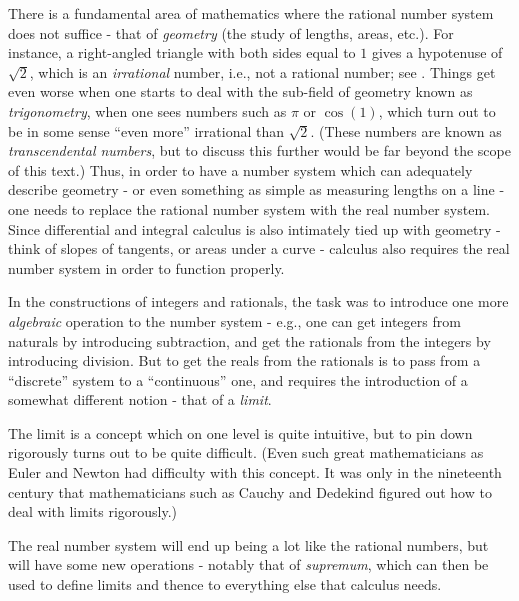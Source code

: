 \begin{note}
  There is a fundamental area of mathematics where the rational number system does not suffice - that of \emph{geometry}
  (the study of lengths, areas, etc.).
  For instance, a right-angled triangle with both sides equal to \(1\) gives a hypotenuse of \(\sqrt{2}\), which is an \emph{irrational} number, i.e., not a rational number;
  see .
  Things get even worse when one starts to deal with the sub-field of geometry known as \emph{trigonometry}, when one sees numbers such as \(\pi\) or \(\cos(1)\), which turn out to be in some sense ``even more'' irrational than \(\sqrt{2}\).
  (These numbers are known as \emph{transcendental numbers}, but to discuss this further would be far beyond the scope of this text.)
  Thus, in order to have a number system which can adequately describe geometry
  - or even something as simple as measuring lengths on a line
  - one needs to replace the rational number system with the real number system.
  Since differential and integral calculus is also intimately tied up with geometry
  - think of slopes of tangents, or areas under a curve
  - calculus also requires the real number system in order to function properly.
\end{note}

\begin{note}
  In the constructions of integers and rationals, the task was to introduce one more \emph{algebraic} operation to the number system
  - e.g., one can get integers from naturals by introducing subtraction, and get the rationals from the integers by introducing division.
  But to get the reals from the rationals is to pass from a ``discrete'' system to a ``continuous'' one, and requires the introduction of a somewhat different notion
  - that of a \emph{limit}.
\end{note}

\begin{note}
  The limit is a concept which on one level is quite intuitive, but to pin down rigorously turns out to be quite difficult.
  (Even such great mathematicians as Euler and Newton had difficulty with this concept.
  It was only in the nineteenth century that mathematicians such as Cauchy and Dedekind figured out how to deal with limits rigorously.)
\end{note}

\begin{note}
  The real number system will end up being a lot like the rational numbers, but will have some new operations
  - notably that of \emph{supremum}, which can then be used to define limits and thence to everything else that calculus needs.
\end{note}

